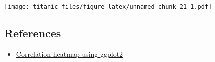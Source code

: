 \documentclass[
]{article}
\providecommand{\tightlist}{%
  \setlength{\itemsep}{0pt}\setlength{\parskip}{0pt}}
\begin{document}
\texttt{[image: titanic\_files/figure-latex/unnamed-chunk-21-1.pdf]}

\hypertarget{references}{%
\subsection{References}\label{references}}

\begin{itemize}
\tightlist
\item
  \href{http://www.sthda.com/english/wiki/ggcorrplot-visualization-of-a-correlation-matrix-using-ggplot2}{Correlation
  heatmap using ggplot2}
\end{itemize}
\end{document}
